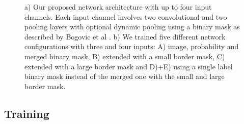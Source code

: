 \begin{figure}[t]
 \centering
    \hfill
	\caption{a) Our proposed network architecture with up to four input channels. Each input channel involves two convolutional and two pooling layers with optional dynamic pooling using a binary mask as described by Bogovic et al \cite{viren}. b) We trained five different network configurations with three and four inputs: A) image, probability and merged binary mask, B) extended with a small border mask, C) extended with a large border mask and D)+E) using a single label binary mask instead of the merged one with the small and large border mask.}
\end{figure}
%  



\subsection{Training}

